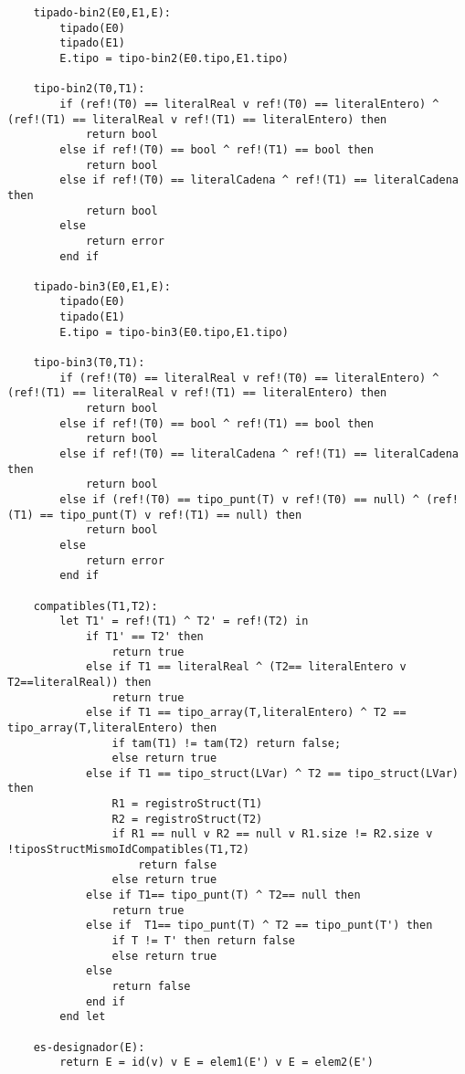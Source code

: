 \begin{lstlisting}
    tipado-bin2(E0,E1,E):
        tipado(E0)
        tipado(E1)
        E.tipo = tipo-bin2(E0.tipo,E1.tipo)

    tipo-bin2(T0,T1):
        if (ref!(T0) == literalReal v ref!(T0) == literalEntero) ^ (ref!(T1) == literalReal v ref!(T1) == literalEntero) then
            return bool
        else if ref!(T0) == bool ^ ref!(T1) == bool then
            return bool
        else if ref!(T0) == literalCadena ^ ref!(T1) == literalCadena then 
            return bool
        else
            return error
        end if

    tipado-bin3(E0,E1,E):
        tipado(E0)
        tipado(E1)
        E.tipo = tipo-bin3(E0.tipo,E1.tipo)

    tipo-bin3(T0,T1):
        if (ref!(T0) == literalReal v ref!(T0) == literalEntero) ^ (ref!(T1) == literalReal v ref!(T1) == literalEntero) then
            return bool
        else if ref!(T0) == bool ^ ref!(T1) == bool then
            return bool
        else if ref!(T0) == literalCadena ^ ref!(T1) == literalCadena then 
            return bool
        else if (ref!(T0) == tipo_punt(T) v ref!(T0) == null) ^ (ref!(T1) == tipo_punt(T) v ref!(T1) == null) then
            return bool
        else
            return error
        end if

    compatibles(T1,T2):
        let T1' = ref!(T1) ^ T2' = ref!(T2) in
            if T1' == T2' then
                return true
            else if T1 == literalReal ^ (T2== literalEntero v T2==literalReal)) then
            	return true
            else if T1 == tipo_array(T,literalEntero) ^ T2 == tipo_array(T,literalEntero) then
                if tam(T1) != tam(T2) return false;
            	else return true
            else if T1 == tipo_struct(LVar) ^ T2 == tipo_struct(LVar) then
                R1 = registroStruct(T1)
                R2 = registroStruct(T2)
                if R1 == null v R2 == null v R1.size != R2.size v !tiposStructMismoIdCompatibles(T1,T2)
                    return false
                else return true
            else if T1== tipo_punt(T) ^ T2== null then
            	return true
            else if  T1== tipo_punt(T) ^ T2 == tipo_punt(T') then
                if T != T' then return false
            	else return true
            else
                return false
            end if
        end let

    es-designador(E):
        return E = id(v) v E = elem1(E') v E = elem2(E')

\end{lstlisting}

